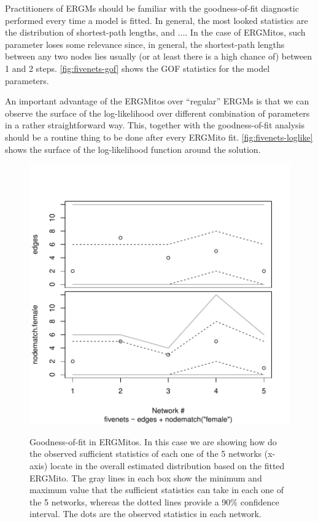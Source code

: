 \documentclass[12pt]{article}
\begin{document}
Practitioners of ERGMs should be familiar with the goodness-of-fit diagnostic performed every time a model is fitted. In general, the most looked statistics are the distribution of shortest-path lengths, and .... In the case of ERGMitos, such parameter loses some relevance since, in general, the shortest-path lengths between any two nodes lies usually (or at least there is a high chance of) between 1 and 2 steps. \autoref{fig:fivenets-gof} shows the GOF statistics for the model parameters.

An important advantage of the ERGMitos over ``regular'' ERGMs is that we can observe the surface of the log-likelihood over different combination of parameters in a rather straightforward way. This, together with the goodness-of-fit analysis should be a routine thing to be done after every ERGMito fit. \autoref{fig:fivenets-loglike} shows the surface of the log-likelihood function around the solution.

\begin{figure}
    \centering
    \caption{Goodness-of-fit in ERGMitos. In this case we are showing how do the observed sufficient statistics of each one of the 5 networks (x-axis) locate in the overall estimated distribution based on the fitted ERGMito. The gray lines in each box show the minimum and maximum value that the sufficient statistics can take in each one of the 5 networks, whereas the dotted lines provide a 90\% confidence interval. The dots are the observed statistics in each network.}
    \includegraphics[width=.7\linewidth]{figures/fivenets_gof.pdf}
    \label{fig:fivenets-gof}
\end{figure}
\end{document}
